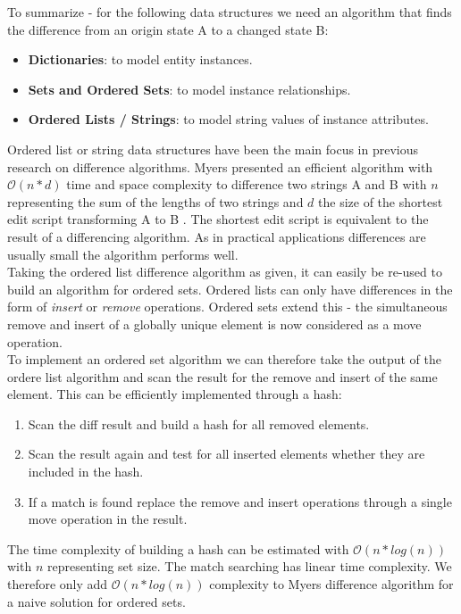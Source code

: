 To summarize - for the following data structures we need an algorithm that finds the difference from an origin state A to a changed state B:

\begin{itemize}
\item \textbf{Dictionaries}: to model entity instances.
\item \textbf{Sets and Ordered Sets}: to model instance relationships.
\item \textbf{Ordered Lists / Strings}: to model string values of instance attributes.
\end{itemize}

Ordered list or string data structures have been the main focus in previous research on difference algorithms.
Myers presented an efficient algorithm with $\mathcal O(n*d) $ time and space complexity to difference two strings A and B with
$ n $ representing the sum of the lengths of two strings and $ d $ the size of the shortest edit script transforming A to B \cite{Myers:1986wi}.
The shortest edit script is equivalent to the result of a differencing algorithm.
As in practical applications differences are usually small the algorithm performs well.\\
Taking the ordered list difference algorithm as given, it can easily be re-used to build an algorithm for ordered sets.
Ordered lists can only have differences in the form of \emph{insert} or \emph{remove} operations.
Ordered sets extend this - the simultaneous remove and insert of a globally unique element is now considered as a move operation.\\

To implement an ordered set algorithm we can therefore take the output of the ordere list algorithm and scan the result for the remove and insert of the same element.
This can be efficiently implemented through a hash:

\begin{enumerate}
\item Scan the diff result and build a hash for all removed elements.
\item Scan the result again and test for all inserted elements whether they are included in the hash.
\item If a match is found replace the remove and insert operations through a single move operation in the result.
\end{enumerate}

The time complexity of building a hash can be estimated with $ \mathcal O(n * log(n)) $ with $ n $ representing set size.
The match searching has linear time complexity.
We therefore only add $ \mathcal O(n * log(n)) $ complexity to Myers difference algorithm for a naive solution for ordered sets.\\

